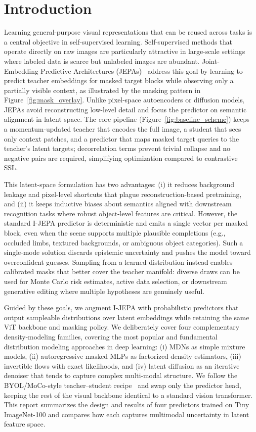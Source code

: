 \documentclass[conference]{IEEEtran}
\begin{document}
\section{Introduction}
Learning general-purpose visual representations that can be reused across tasks is a central objective in self-supervised learning.
Self-supervised methods that operate directly on raw images are particularly attractive in large-scale settings where labeled data is scarce but unlabeled images are abundant.
Joint-Embedding Predictive Architectures (JEPAs)~\cite{assran2023jepa} address this goal by learning to predict teacher embeddings for masked target blocks while observing only a partially visible context, as illustrated by the masking pattern in Figure~\ref{fig:mask_overlay}.
Unlike pixel-space autoencoders or diffusion models, JEPAs avoid reconstructing low-level detail and focus the predictor on semantic alignment in latent space.
The core pipeline (Figure~\ref{fig:baseline_scheme}) keeps a momentum-updated teacher that encodes the full image, a student that sees only context patches, and a predictor that maps masked target queries to the teacher's latent targets; decorrelation terms prevent trivial collapse and no negative pairs are required, simplifying optimization compared to contrastive SSL.

This latent-space formulation has two advantages: (i) it reduces background leakage and pixel-level shortcuts that plague reconstruction-based pretraining, and (ii) it keeps inductive biases about semantics aligned with downstream recognition tasks where robust object-level features are critical.
However, the standard I-JEPA predictor is deterministic and emits a single vector per masked block, even when the scene supports multiple plausible completions (e.g., occluded limbs, textured backgrounds, or ambiguous object categories).
Such a single-mode solution discards epistemic uncertainty and pushes the model toward overconfident guesses.
Sampling from a learned distribution instead enables calibrated masks that better cover the teacher manifold: diverse draws can be used for Monte Carlo risk estimates, active data selection, or downstream generative editing where multiple hypotheses are genuinely useful.

Guided by these goals, we augment I-JEPA with probabilistic predictors that output sampleable distributions over latent embeddings while retaining the same ViT backbone and masking policy.
We deliberately cover four complementary density-modeling families, covering the most popular and fundamental distribution modeling approaches in deep learning: (i) MDNs as simple mixture models, (ii) autoregressive masked MLPs as factorized density estimators, (iii) invertible flows with exact likelihoods, and (iv) latent diffusion as an iterative denoiser that tends to capture complex multi-modal structure.
We follow the BYOL/MoCo-style teacher--student recipe~\cite{grill2020byol,chen2020moco} and swap only the predictor head, keeping the rest of the visual backbone identical to a standard vision transformer.
This report summarizes the design and results of four predictors trained on Tiny ImageNet-100 and compares how each captures multimodal uncertainty in latent feature space.
\end{document}
